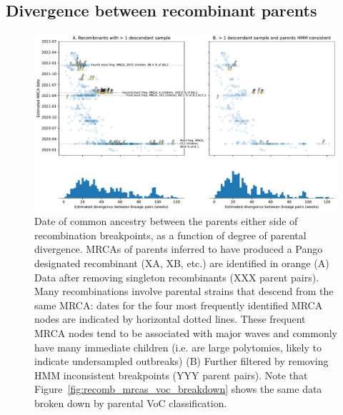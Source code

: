 \documentclass{article}
\begin{document}
\subsection{Divergence between recombinant parents}
\label{sec:parent_divergence}

\begin{figure} \centering
\includegraphics[width=\textwidth]{figures/recombination_node_mrcas.pdf}
\caption{\label{fig:recomb_mrcas}
Date of common ancestry between the parents either side of recombination
breakpoints, as a function of degree of parental divergence. MRCAs of parents
inferred to have produced a Pango designated recombinant (XA, XB, etc.) are
identified in orange (A) Data after removing singleton recombinants (XXX parent
pairs). Many recombinations involve parental strains that descend from the same
MRCA: dates for the four most frequently identified MRCA nodes are indicated by
horizontal dotted lines. These frequent MRCA nodes tend to be associated with
major waves and commonly have many immediate children (i.e. are large
polytomies, likely to indicate undersampled outbreaks) (B) Further filtered by
removing HMM inconsistent breakpoints (YYY parent pairs). Note that
Figure~\ref{fig:recomb_mrcas_voc_breakdown} shows the same data broken down by
parental VoC classification.}
\end{figure}
\end{document}
